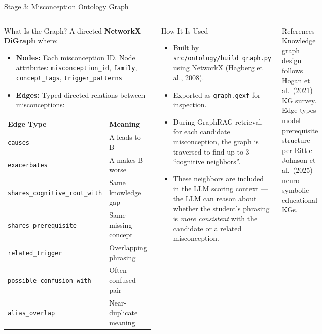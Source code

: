 ﻿\documentclass[aspectratio=169,10pt]{beamer}
\begin{document}
\begin{frame}{Stage 3: Misconception Ontology Graph}
\begin{columns}[T]
\begin{block}{What Is the Graph?}
A directed \textbf{NetworkX DiGraph} where:
\begin{itemize}
  \item \textbf{Nodes:} Each misconception ID. Node attributes: \texttt{misconception\_id}, \texttt{family}, \texttt{concept\_tags}, \texttt{trigger\_patterns}
  \item \textbf{Edges:} Typed directed relations between misconceptions:
\end{itemize}
\begin{center}
\scriptsize
\begin{tabular}{ll}
\toprule
Edge Type & Meaning\\
\midrule
\texttt{causes} & A leads to B\\
\texttt{exacerbates} & A makes B worse\\
\texttt{shares\_cognitive\_root\_with} & Same knowledge gap\\
\texttt{shares\_prerequisite} & Same missing concept\\
\texttt{related\_trigger} & Overlapping phrasing\\
\texttt{possible\_confusion\_with} & Often confused pair\\
\texttt{alias\_overlap} & Near-duplicate meaning\\
\bottomrule
\end{tabular}
\end{center}
\end{block}
\begin{block}{How It Is Used}
\begin{itemize}
  \item Built by \texttt{src/ontology/build\_graph.py} using NetworkX (Hagberg et al., 2008).
  \item Exported as \texttt{graph.gexf} for inspection.
  \item During GraphRAG retrieval, for each candidate misconception, the graph is traversed to find up to 3 ``cognitive neighbors''.
  \item These neighbors are included in the LLM scoring context --- the LLM can reason about whether the student's phrasing is \textit{more consistent} with the candidate or a related misconception.
\end{itemize}
\end{block}
\vspace{8pt}
\begin{block}{References}
Knowledge graph design follows Hogan et al.\ (2021) KG survey. Edge types model prerequisite structure per Rittle-Johnson et al.\ (2025) neuro-symbolic educational KGs.
\end{block}
\end{columns}
\end{frame}
\end{document}
